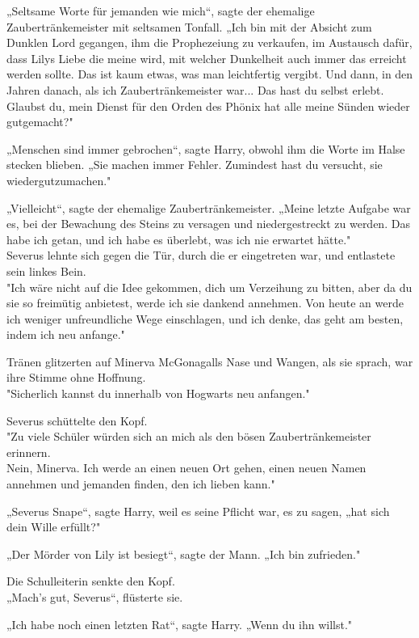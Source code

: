 {„Seltsame Worte für jemanden wie mich“, sagte der ehemalige Zaubertränkemeister mit seltsamen Tonfall. „Ich bin mit der Absicht zum Dunklen Lord gegangen, ihm die Prophezeiung zu verkaufen, im Austausch dafür, dass Lilys Liebe die meine wird, mit welcher Dunkelheit auch immer das erreicht werden sollte. Das ist kaum etwas, was man leichtfertig vergibt. Und dann, in den Jahren danach, als ich Zaubertränkemeister war... Das hast du selbst erlebt. Glaubst du, mein Dienst für den Orden des Phönix hat alle meine Sünden wieder gutgemacht?"

„Menschen sind immer gebrochen“, sagte Harry, obwohl ihm die Worte im Halse stecken blieben. „Sie machen immer Fehler. Zumindest hast du versucht, sie wiedergutzumachen."

„Vielleicht“, sagte der ehemalige Zaubertränkemeister. „Meine letzte Aufgabe war es, bei der Bewachung des Steins zu versagen und niedergestreckt zu werden. Das habe ich getan, und ich habe es überlebt, was ich nie erwartet hätte."\\ Severus lehnte sich gegen die Tür, durch die er eingetreten war, und entlastete sein linkes Bein.\\ "Ich wäre nicht auf die Idee gekommen, dich um Verzeihung zu bitten, aber da du sie so freimütig anbietest, werde ich sie dankend annehmen. Von heute an werde ich weniger unfreundliche Wege einschlagen, und ich denke, das geht am besten, indem ich neu anfange."

Tränen glitzerten auf Minerva McGonagalls Nase und Wangen, als sie sprach, war ihre Stimme ohne Hoffnung.\\ "Sicherlich kannst du innerhalb von Hogwarts neu anfangen."

Severus schüttelte den Kopf.\\ "Zu viele Schüler würden sich an mich als den bösen Zaubertränkemeister erinnern.\\ Nein, Minerva. Ich werde an einen neuen Ort gehen, einen neuen Namen annehmen und jemanden finden, den ich lieben kann."

„Severus Snape“, sagte Harry, weil es seine Pflicht war, es zu sagen, „hat sich dein Wille erfüllt?"

„Der Mörder von Lily ist besiegt“, sagte der Mann. „Ich bin zufrieden."

Die Schulleiterin senkte den Kopf.\\ „Mach's gut, Severus“, flüsterte sie.

„Ich habe noch einen letzten Rat“, sagte Harry. „Wenn du ihn willst."

}

